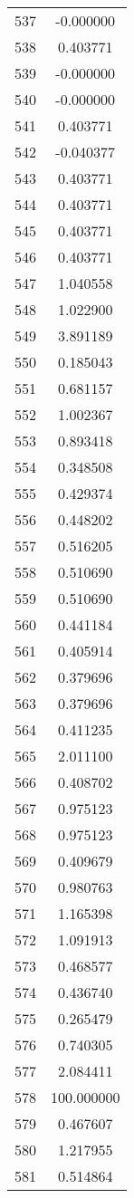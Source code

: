 \documentclass[12pt]{article}
\begin{document}
\begin{longtable}{@{}cc@{}}
537 & -0.000000 \\
538 & 0.403771 \\
539 & -0.000000 \\
540 & -0.000000 \\
541 & 0.403771 \\
542 & -0.040377 \\
543 & 0.403771 \\
544 & 0.403771 \\
545 & 0.403771 \\
546 & 0.403771 \\
547 & 1.040558 \\
548 & 1.022900 \\
549 & 3.891189 \\
550 & 0.185043 \\
551 & 0.681157 \\
552 & 1.002367 \\
553 & 0.893418 \\
554 & 0.348508 \\
555 & 0.429374 \\
556 & 0.448202 \\
557 & 0.516205 \\
558 & 0.510690 \\
559 & 0.510690 \\
560 & 0.441184 \\
561 & 0.405914 \\
562 & 0.379696 \\
563 & 0.379696 \\
564 & 0.411235 \\
565 & 2.011100 \\
566 & 0.408702 \\
567 & 0.975123 \\
568 & 0.975123 \\
569 & 0.409679 \\
570 & 0.980763 \\
571 & 1.165398 \\
572 & 1.091913 \\
573 & 0.468577 \\
574 & 0.436740 \\
575 & 0.265479 \\
576 & 0.740305 \\
577 & 2.084411 \\
578 & 100.000000 \\
579 & 0.467607 \\
580 & 1.217955 \\
581 & 0.514864 \\

\end{longtable}
\end{document}
